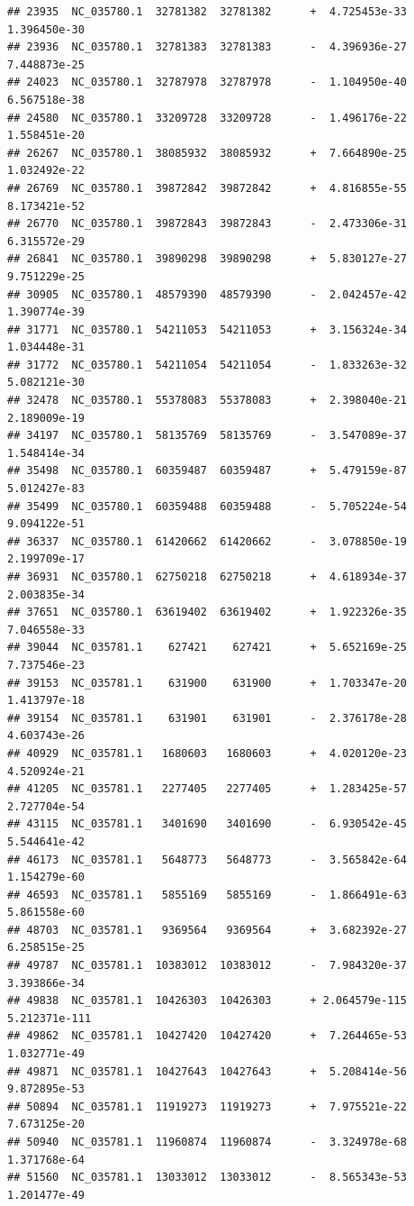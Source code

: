 \documentclass[]{article}
\begin{document}
\begin{verbatim}
## 23935  NC_035780.1  32781382  32781382      +  4.725453e-33  1.396450e-30
## 23936  NC_035780.1  32781383  32781383      -  4.396936e-27  7.448873e-25
## 24023  NC_035780.1  32787978  32787978      -  1.104950e-40  6.567518e-38
## 24580  NC_035780.1  33209728  33209728      -  1.496176e-22  1.558451e-20
## 26267  NC_035780.1  38085932  38085932      +  7.664890e-25  1.032492e-22
## 26769  NC_035780.1  39872842  39872842      +  4.816855e-55  8.173421e-52
## 26770  NC_035780.1  39872843  39872843      -  2.473306e-31  6.315572e-29
## 26841  NC_035780.1  39890298  39890298      +  5.830127e-27  9.751229e-25
## 30905  NC_035780.1  48579390  48579390      -  2.042457e-42  1.390774e-39
## 31771  NC_035780.1  54211053  54211053      +  3.156324e-34  1.034448e-31
## 31772  NC_035780.1  54211054  54211054      -  1.833263e-32  5.082121e-30
## 32478  NC_035780.1  55378083  55378083      +  2.398040e-21  2.189009e-19
## 34197  NC_035780.1  58135769  58135769      -  3.547089e-37  1.548414e-34
## 35498  NC_035780.1  60359487  60359487      +  5.479159e-87  5.012427e-83
## 35499  NC_035780.1  60359488  60359488      -  5.705224e-54  9.094122e-51
## 36337  NC_035780.1  61420662  61420662      -  3.078850e-19  2.199709e-17
## 36931  NC_035780.1  62750218  62750218      +  4.618934e-37  2.003835e-34
## 37651  NC_035780.1  63619402  63619402      +  1.922326e-35  7.046558e-33
## 39044  NC_035781.1    627421    627421      +  5.652169e-25  7.737546e-23
## 39153  NC_035781.1    631900    631900      +  1.703347e-20  1.413797e-18
## 39154  NC_035781.1    631901    631901      -  2.376178e-28  4.603743e-26
## 40929  NC_035781.1   1680603   1680603      +  4.020120e-23  4.520924e-21
## 41205  NC_035781.1   2277405   2277405      +  1.283425e-57  2.727704e-54
## 43115  NC_035781.1   3401690   3401690      -  6.930542e-45  5.544641e-42
## 46173  NC_035781.1   5648773   5648773      -  3.565842e-64  1.154279e-60
## 46593  NC_035781.1   5855169   5855169      -  1.866491e-63  5.861558e-60
## 48703  NC_035781.1   9369564   9369564      +  3.682392e-27  6.258515e-25
## 49787  NC_035781.1  10383012  10383012      -  7.984320e-37  3.393866e-34
## 49838  NC_035781.1  10426303  10426303      + 2.064579e-115 5.212371e-111
## 49862  NC_035781.1  10427420  10427420      +  7.264465e-53  1.032771e-49
## 49871  NC_035781.1  10427643  10427643      +  5.208414e-56  9.872895e-53
## 50894  NC_035781.1  11919273  11919273      +  7.975521e-22  7.673125e-20
## 50940  NC_035781.1  11960874  11960874      -  3.324978e-68  1.371768e-64
## 51560  NC_035781.1  13033012  13033012      -  8.565343e-53  1.201477e-49

\end{verbatim}
\end{document}
